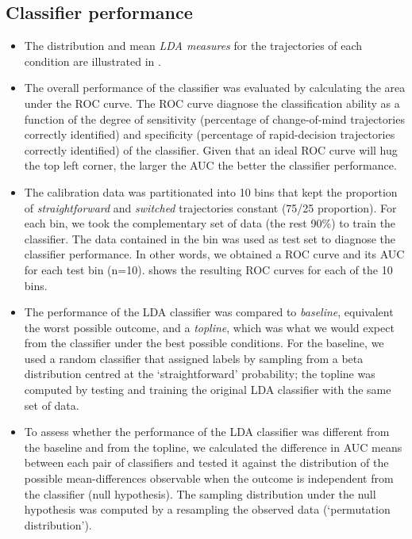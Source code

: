 \documentclass{article}
\begin{document}

\subsection{Classifier performance} 

\begin{itemize}
\item The distribution and mean \textit{LDA measures} for the trajectories of each condition are illustrated in . 

\item The overall performance of the classifier was evaluated by calculating the area under the ROC curve. The ROC curve diagnose the classification ability as a function of the degree of sensitivity (percentage of change-of-mind trajectories correctly identified) and specificity (percentage of rapid-decision trajectories correctly identified) of the classifier. Given that an ideal ROC curve will hug the top left corner, the larger the AUC the better the classifier performance. 

\item The calibration data was partitionated into 10 bins that kept the proportion of \textit{straightforward} and \textit{switched} trajectories constant (75/25 proportion). For each bin, we took the complementary set of data (the rest 90\%) to train the classifier. The data contained in the bin was used as test set to diagnose the classifier performance. In other words, we obtained a ROC curve and its AUC for each test bin (n=10).  shows the resulting ROC curves for each of the 10 bins.  

\item The performance of the LDA classifier was compared to \emph{baseline}, equivalent the worst possible outcome, and a \emph{topline}, which was what we would expect from the classifier under the best possible conditions. 
For the baseline, we used a random classifier that assigned labels by sampling from a beta distribution centred at the `straightforward' probability; the topline was computed by testing and training the original LDA classifier with the same set of data. 

\item To assess whether the performance of the LDA classifier was different from the baseline and from the topline, we calculated the difference in AUC means between each pair of classifiers and tested it against the distribution of the possible mean-differences observable when the outcome is independent from the classifier (null hypothesis). 
The sampling distribution under the null hypothesis was computed by a resampling the observed data (`permutation distribution'). 


\end{itemize}
\end{document}
